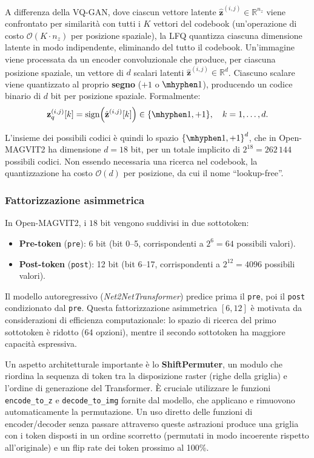 A differenza della VQ-GAN, dove ciascun vettore latente $\hat{\mathbf{z}}^{(i,j)} \in \mathbb{R}^{n_z}$ viene confrontato per similarità con tutti i $K$ vettori del codebook (un'operazione di costo $\mathcal{O}(K \cdot n_z)$ per posizione spaziale), la LFQ quantizza ciascuna dimensione latente in modo indipendente, eliminando del tutto il codebook. Un'immagine viene processata da un encoder convoluzionale che produce, per ciascuna posizione spaziale, un vettore di $d$ scalari latenti $\hat{\mathbf{z}}^{(i,j)} \in \mathbb{R}^d$. Ciascuno scalare viene quantizzato al proprio \textbf{segno} ($+1$ o $\mhyphen1$), producendo un codice binario di $d$ bit per posizione spaziale. Formalmente:
\[
\mathbf{z}_q^{(i,j)}[k] = \mathrm{sign}\Bigl(\hat{\mathbf{z}}^{(i,j)}[k]\Bigr) \in \{\mhyphen1, +1\}, \quad k = 1, \dots, d.
\]

L'insieme dei possibili codici è quindi lo spazio ${\{\mhyphen1, +1\}}^d$, che in Open-MAGVIT2 ha dimensione $d = 18$ bit, per un totale implicito di $2^{18} = 262\,144$ possibili codici. Non essendo necessaria una ricerca nel codebook, la quantizzazione ha costo $\mathcal{O}(d)$ per posizione, da cui il nome ``lookup-free''.

\subsubsection{Fattorizzazione asimmetrica}

In Open-MAGVIT2, i $18$ bit vengono suddivisi in due sottotoken:

\begin{itemize}
	\item \textbf{Pre-token} (\texttt{pre}): 6 bit (bit 0--5, corrispondenti a $2^6 = 64$ possibili valori).
	\item \textbf{Post-token} (\texttt{post}): 12 bit (bit 6--17, corrispondenti a $2^{12} = 4096$ possibili valori).
\end{itemize}

Il modello autoregressivo (\emph{Net2NetTransformer}) predice prima il \texttt{pre}, poi il \texttt{post} condizionato dal \texttt{pre}. Questa fattorizzazione asimmetrica $[6, 12]$ è motivata da considerazioni di efficienza computazionale: lo spazio di ricerca del primo sottotoken è ridotto (64 opzioni), mentre il secondo sottotoken ha maggiore capacità espressiva.

Un aspetto architetturale importante è lo \textbf{ShiftPermuter}, un modulo che riordina la sequenza di token tra la disposizione raster (righe della griglia) e l'ordine di generazione del Transformer. È cruciale utilizzare le funzioni \texttt{encode\_to\_z} e \texttt{decode\_to\_img} fornite dal modello, che applicano e rimuovono automaticamente la permutazione. Un uso diretto delle funzioni di encoder/decoder senza passare attraverso queste astrazioni produce una griglia con i token disposti in un ordine scorretto (permutati in modo incoerente rispetto all'originale) e un flip rate dei token prossimo al 100\%.

